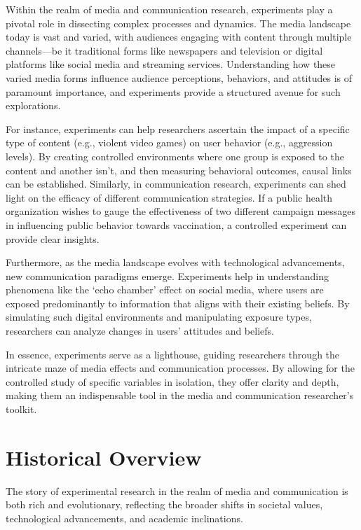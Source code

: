 \documentclass[
  b5paper]{book}
\begin{document}
Within the realm of media and communication research, experiments play a pivotal role in dissecting complex processes and dynamics. The media landscape today is vast and varied, with audiences engaging with content through multiple channels---be it traditional forms like newspapers and television or digital platforms like social media and streaming services. Understanding how these varied media forms influence audience perceptions, behaviors, and attitudes is of paramount importance, and experiments provide a structured avenue for such explorations.

For instance, experiments can help researchers ascertain the impact of a specific type of content (e.g., violent video games) on user behavior (e.g., aggression levels). By creating controlled environments where one group is exposed to the content and another isn't, and then measuring behavioral outcomes, causal links can be established. Similarly, in communication research, experiments can shed light on the efficacy of different communication strategies. If a public health organization wishes to gauge the effectiveness of two different campaign messages in influencing public behavior towards vaccination, a controlled experiment can provide clear insights.

Furthermore, as the media landscape evolves with technological advancements, new communication paradigms emerge. Experiments help in understanding phenomena like the `echo chamber' effect on social media, where users are exposed predominantly to information that aligns with their existing beliefs. By simulating such digital environments and manipulating exposure types, researchers can analyze changes in users' attitudes and beliefs.

In essence, experiments serve as a lighthouse, guiding researchers through the intricate maze of media effects and communication processes. By allowing for the controlled study of specific variables in isolation, they offer clarity and depth, making them an indispensable tool in the media and communication researcher's toolkit.

\hypertarget{historical-overview}{%
\section{Historical Overview}\label{historical-overview}}

The story of experimental research in the realm of media and communication is both rich and evolutionary, reflecting the broader shifts in societal values, technological advancements, and academic inclinations.
\end{document}
